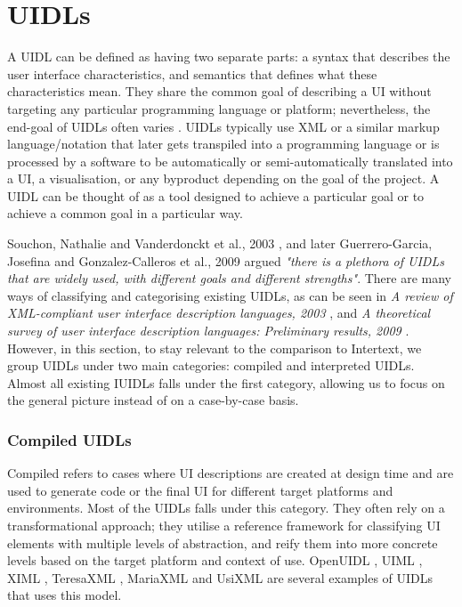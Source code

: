 
\section{UIDLs} \label{relatedUIDLs}

A UIDL can be defined as having two separate parts: a syntax that describes the user interface characteristics, and semantics that defines what these characteristics mean. They share the common goal of describing a UI without targeting any particular programming language or platform; nevertheless, the end-goal of UIDLs often varies \cite{XMLCompliantUIDLs}. UIDLs typically use XML or a similar markup language/notation that later gets transpiled into a programming language or is processed by a software to be automatically or semi-automatically translated into a UI, a visualisation, or any byproduct depending on the goal of the project. A UIDL can be thought of as a tool designed to achieve a particular goal or to achieve a common goal in a particular way. 

Souchon, Nathalie and Vanderdonckt et al., 2003 \cite{XMLCompliantUIDLs}, and later Guerrero-Garcia, Josefina and Gonzalez-Calleros et al., 2009 \cite{UIDLTheoreticalSurvey} argued \textit{"there is a plethora of UIDLs that are widely used, with different goals and different strengths"}. There are many ways of classifying and categorising existing UIDLs, as can be seen in \textit{A review of XML-compliant user interface description languages, 2003} \cite{XMLCompliantUIDLs}, and \textit{A theoretical survey of user interface description languages: Preliminary results, 2009} \cite{UIDLTheoreticalSurvey}. However, in this section, to stay relevant to the comparison to Intertext, we group UIDLs under two main categories: compiled and interpreted UIDLs. Almost all existing IUIDLs falls under the first category, allowing us to focus on the general picture instead of on a case-by-case basis.

\subsubsection{Compiled UIDLs}

Compiled refers to cases where UI descriptions are created at design time and are used to generate code or the final UI for different target platforms and environments. Most of the UIDLs falls under this category. They often rely on a transformational approach; they utilise a reference framework for classifying UI elements with multiple levels of abstraction, and reify them into more concrete levels based on the target platform and context of use. OpenUIDL \cite{openuidl}, UIML \cite{UIML}, XIML \cite{XIML}, TeresaXML \cite{TeresaXML}, MariaXML \cite{MariaXML} and UsiXML \cite{UsiXML} are several examples of UIDLs that uses this model. 


